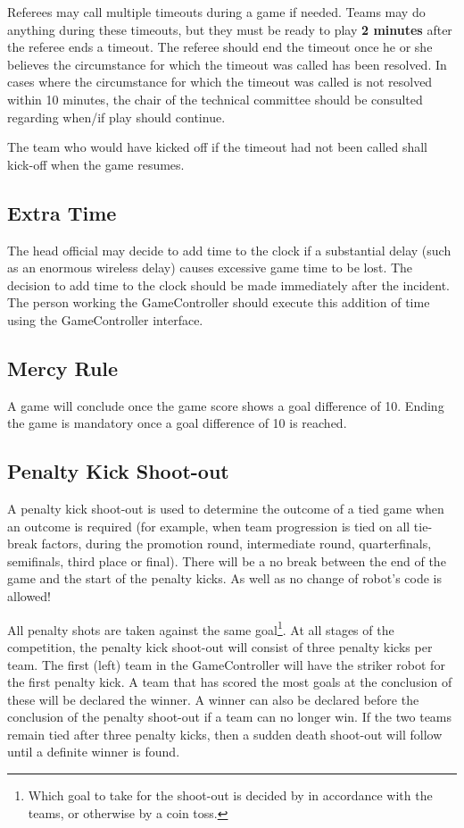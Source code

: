Referees may call multiple timeouts during a game if needed.  Teams may do anything during these timeouts, but they must be ready to play \textbf{2 minutes} after the referee ends a timeout.  The referee should end the timeout once he or she believes the circumstance for which the timeout was called has been resolved.  In cases where the circumstance for which the timeout was called is not resolved within 10 minutes, the chair of the technical committee should be consulted regarding when/if play should continue.

The team who would have kicked off if the timeout had not been called shall kick-off when the game resumes.

\subsection{Extra Time}
\label{sec:extra_time}
The head official may decide to add time to the clock if a substantial delay (such as an enormous wireless delay) causes excessive game time to be lost.  The decision to add time to the clock should be made immediately after the incident.  The person working the GameController should execute this addition of time using the GameController interface.

\subsection{Mercy Rule}
\label{sec:mercy_rule}
A game will conclude once the game score shows a goal difference of 10.  Ending the game is mandatory once a goal difference of 10 is reached.

\subsection{Penalty Kick Shoot-out}
\label{sec:penalty_shoot-out}

A penalty kick shoot-out is used to determine the outcome of a tied game when an outcome is required (for example, when team progression is tied on all tie-break factors, during the promotion round, intermediate round, quarterfinals, semifinals, third place or final).
There will be a no break between the end of the game and the start of the penalty kicks. As well as no change of robot's code is allowed!

All penalty shots are taken against the same goal\footnote{Which goal to take for the shoot-out is decided by in accordance with the teams, or otherwise by a coin toss.}.
At all stages of the competition, the penalty kick shoot-out will consist of three penalty kicks per team.
The first (left) team in the GameController will have the striker robot for the first penalty kick.
A team that has scored the most goals at the conclusion of these will be declared the winner. A winner can also be declared before the conclusion of the penalty shoot-out if a team can no longer win. If the two teams remain tied after three penalty kicks, then a sudden death shoot-out will follow until a definite winner is found.

